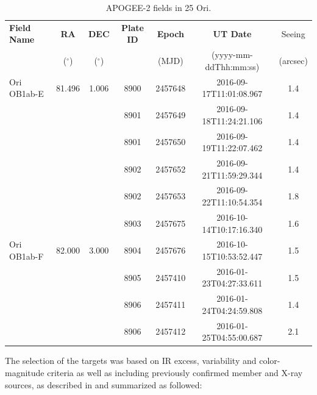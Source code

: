 \documentclass[12pt]{article}
\newcounter{subsubsubsection}[subsubsection]
\begin{document}
\begin{table}[ht!] \tiny
\begin{center}
 \caption{APOGEE-2 fields in 25 Ori.}
 \label{tab:APOGEE-2_fields}
 \begin{threeparttable}
  	\setlength{\tabcolsep}{11pt}
	\begin{tabular}{lcccccc}
	\toprule
	{\bf Field Name} & {\bf RA}    & {\bf DEC}  & {\bf Plate ID} & {\bf Epoch} & {\bf UT Date}         & Seeing   \\
	                 & ($^\circ$) & ($^\circ$)  &                & (MJD)       & (yyyy-mm-ddThh:mm:ss) & (arcsec) \\
	\midrule
	Ori OB1ab-E & 81.496 & 1.006 & 8900 & 2457648 & 2016-09-17T11:01:08.967 & 1.4 \\
	            &        &       & 8901 & 2457649 & 2016-09-18T11:24:21.106 & 1.4 \\
	            &        &       & 8901 & 2457650 & 2016-09-19T11:22:07.462 & 1.4 \\
	            &        &       & 8902 & 2457652 & 2016-09-21T11:59:29.344 & 1.4 \\
	            &        &       & 8902 & 2457653 & 2016-09-22T11:10:54.354 & 1.8 \\
	            &        &       & 8903 & 2457675 & 2016-10-14T10:17:16.340 & 1.6 \\
	\midrule
	Ori OB1ab-F & 82.000 & 3.000 & 8904 & 2457676 & 2016-10-15T10:53:52.447 & 1.5 \\
	            &        &       & 8905 & 2457410 & 2016-01-23T04:27:33.611 & 1.5 \\
	            &        &       & 8906 & 2457411 & 2016-01-24T04:24:59.808 & 1.4 \\
	            &        &       & 8906 & 2457412 & 2016-01-25T04:55:00.687 & 2.1 \\
	\bottomrule
	\end{tabular}
 \end{threeparttable}
\end{center}
\end{table}

\label{sec_APOGEE-2:targets}
The selection of the targets was based on IR excess, variability and color-magnitude criteria as well as including previously confirmed member and X-ray sources, as described in \citet{Cottle2018} and summarized as followed:
\end{document}
